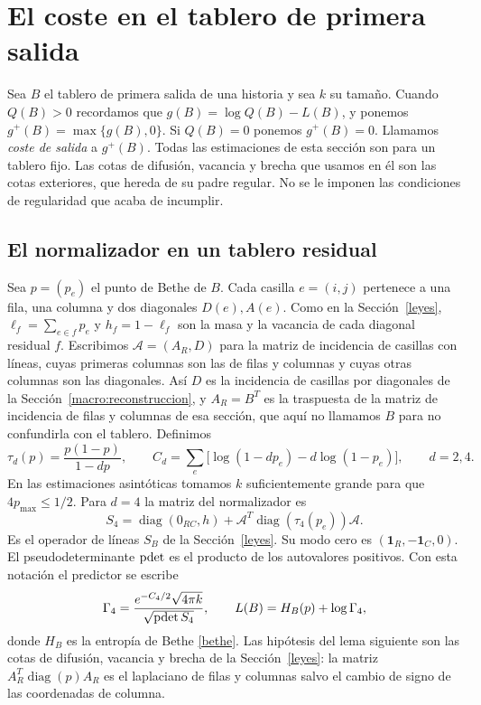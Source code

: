 \section{El coste en el tablero de primera salida}\label{costes}

Sea $B$ el tablero de primera salida de una historia y sea $k$ su tamaño. Cuando $Q(B)>0$ recordamos
que $g(B)=\log Q(B)-L(B)$, y ponemos $g^+(B)=\max\{g(B),0\}$. Si $Q(B)=0$ ponemos
$g^+(B)=0$. Llamamos \emph{coste de salida} a $g^+(B)$. Todas las estimaciones de esta sección son
para un tablero fijo. Las cotas de difusión, vacancia y brecha que usamos en él son las cotas
exteriores, que hereda de su padre regular. No se le imponen las condiciones de regularidad que
acaba de incumplir.

\subsection{El normalizador en un tablero residual}\label{costes:normalizador}

Sea $p=(p_e)$ el punto de Bethe de $B$. Cada casilla $e=(i,j)$
pertenece a una fila, una columna y dos diagonales $D(e),A(e)$. Como en la Sección~\ref{leyes},
$\ell_f=\sum_{e\in f}p_e$ y $h_f=1-\ell_f$ son la masa y la vacancia de cada diagonal residual $f$.
Escribimos $\mathcal A=(A_R,D)$ para la matriz de
incidencia de casillas con líneas, cuyas primeras columnas son las de filas y columnas y cuyas otras
columnas son las diagonales. Así $D$ es la incidencia de casillas por diagonales de la
Sección~\ref{macro:reconstruccion}, y $A_R=B^T$ es la traspuesta de la matriz de incidencia de filas
y columnas de esa sección, que aquí no llamamos $B$ para no confundirla con el tablero. Definimos
\[
 \tau_d(p)=\frac{p(1-p)}{1-dp},\qquad
 C_d=\sum_e\bigl[\log(1-dp_e)-d\log(1-p_e)\bigr],\qquad d=2,4 .
\]
En las estimaciones asintóticas tomamos $k$ suficientemente grande para que $4p_{\max}\le1/2$. Para
$d=4$ la matriz del normalizador es
\[
 S_4=\operatorname{diag}(0_{RC},h)+
          \mathcal A^T\operatorname{diag}(\tau_4(p_e))\mathcal A .
\]
Es el operador de líneas $S_B$ de la Sección~\ref{leyes}. Su modo cero es
$(\mathbf1_R,-\mathbf1_C,0)$. El pseudodeterminante $\operatorname{pdet}$ es el producto de los
autovalores positivos. Con esta notación el predictor se escribe
\[
 \Gamma_4=\frac{e^{-C_4/2}\sqrt{4\pi k}}{\sqrt{\operatorname{pdet} S_4}},
 \qquad L(B)=H_B(p)+\log\Gamma_4 ,
\]
donde $H_B$ es la entropía de Bethe \eqref{bethe}. Las hipótesis del lema siguiente son las cotas
de difusión, vacancia y brecha de la Sección~\ref{leyes}: la matriz
$A_R^T\operatorname{diag}(p)A_R$ es el laplaciano de filas y columnas salvo el cambio de signo de
las coordenadas de columna.

